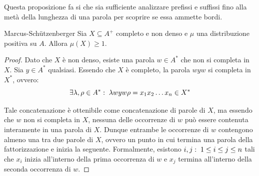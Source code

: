 Questa proposizione fa si che sia sufficiente analizzare prefissi e suffissi fino alla metà della lunghezza di una parola per scoprire se essa ammette bordi.

\begin{lemma}[label=lem:marcus-schutzenberger]{Marcus-Schützenberger}
  Sia \(X \subseteq A^+\) completo e non denso e \(\mu\) una distribuzione positiva su \(A\).
  Allora \(\mu(X) \geq 1\).
\end{lemma}
\begin{proof}
  Dato che \(X\) è non denso, esiste una parola \(w \in A^*\) che non si completa in \(X\).
  Sia \(y \in A^*\) qualsiasi.
  Essendo che \(X\) è completo, la parola \(wyw\) si completa in \(X^*\), ovvero:
  \[\exists \lambda,\rho \in A^*:\; \lambda w y w \rho  = x_1x_2\ldots x_n\in X^*\]
  \begin{figure}[H]
    \centering
  \end{figure}

  Tale concatenazione è ottenibile come concatenazione di parole di \(X\), ma essendo che \(w\) non si completa in \(X\), nessuna delle occorrenze di \(w\) può essere contenuta interamente in una parola di \(X\).
  Dunque entrambe le occorrenze di \(w\) contengono almeno una  tra due parole di \(X\), ovvero un punto in cui termina una parola della fattorizzazione e inizia la seguente.
  Formalmente, esistono \(i,j :\; 1 \leq i \leq j \leq n\) tali che \(x_i\) inizia all'interno della prima occorrenza di \(w\) e \(x_j\) termina all'interno della seconda occorrenza di \(w\).


\end{proof}
